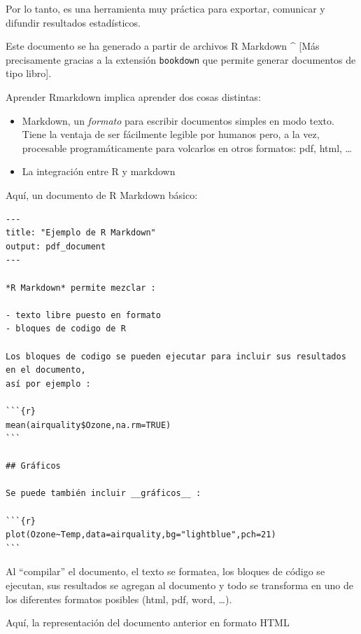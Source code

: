 \documentclass[
]{article}
\providecommand{\tightlist}{%
  \setlength{\itemsep}{0pt}\setlength{\parskip}{0pt}}
\numberwithin{ejcnt}{section}
\begin{document}
Por lo tanto, es una herramienta muy práctica para exportar, comunicar y difundir resultados estadísticos.

Este documento se ha generado a partir de archivos R Markdown \^{} {[}Más precisamente gracias a la extensión \texttt{bookdown} que permite generar documentos de tipo libro{]}.

Aprender Rmarkdown implica aprender dos cosas distintas:

\begin{itemize}
\tightlist
\item
  Markdown, un \emph{formato} para escribir documentos simples en modo texto. Tiene la ventaja de ser fácilmente legible por humanos pero, a la vez, procesable programáticamente para volcarlos en otros formatos: pdf, html, \ldots{}
\item
  La integración entre R y markdown
\end{itemize}

Aquí, un documento de R Markdown básico:

\begin{verbatim}
---
title: "Ejemplo de R Markdown"
output: pdf_document
---

*R Markdown* permite mezclar :

- texto libre puesto en formato
- bloques de codigo de R

Los bloques de codigo se pueden ejecutar para incluir sus resultados en el documento,
así por ejemplo :

```{r}
mean(airquality$Ozone,na.rm=TRUE)
```

## Gráficos

Se puede también incluir __gráficos__ :

```{r}
plot(Ozone~Temp,data=airquality,bg="lightblue",pch=21)
```
\end{verbatim}

Al ``compilar'' el documento, el texto se formatea, los bloques de código se ejecutan, sus resultados se agregan al documento y todo se transforma en uno de los diferentes formatos posibles (html, pdf, word, \ldots).

Aquí, la representación del documento anterior en formato HTML
\end{document}
